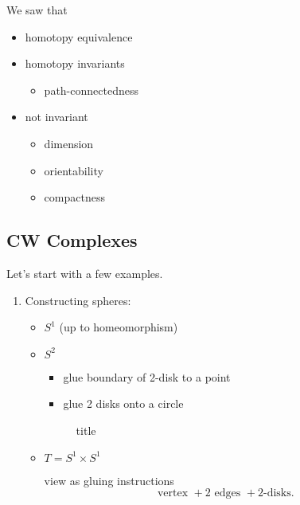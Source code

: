\begin{prev}
	We saw that
	\begin{itemize}
		\item homotopy equivalence
		\item homotopy invariants
		      \begin{itemize}
			      \item path-connectedness
		      \end{itemize}
		\item not invariant
		      \begin{itemize}
			      \item dimension
			      \item orientability
			      \item compactness
		      \end{itemize}
	\end{itemize}
\end{prev}

\subsection{CW Complexes}
\begin{eg}
	Let's start with a few examples.
	\begin{enumerate}
		\item Constructing spheres:
		      \begin{itemize}
			      \item \(S^1\) (up to homeomorphism)
			            \begin{figure}[H]
				            \centering
				            \label{fig:eg:constructing-sphere-1}
			            \end{figure}
			      \item \(S^2\)
			            \begin{itemize}
				            \item glue boundary of 2-disk to a point
				            \item glue 2 disks onto a circle
			            \end{itemize}
			            \begin{figure}[H]
				            \centering
				            \caption{title}
				            \label{fig:eg:constructing-sphere-2}
			            \end{figure}
			      \item \(T = S^1 \times S^1\)
			            \begin{figure}[H]
				            \centering
				            \label{fig:eg:constructing-torus}
			            \end{figure}
			            view as gluing instructions
			            \[
				            \text{vertex }+ 2 \text{ edges }+2\text{-disks}.
			            \]
		      \end{itemize}
	\end{enumerate}
\end{eg}

